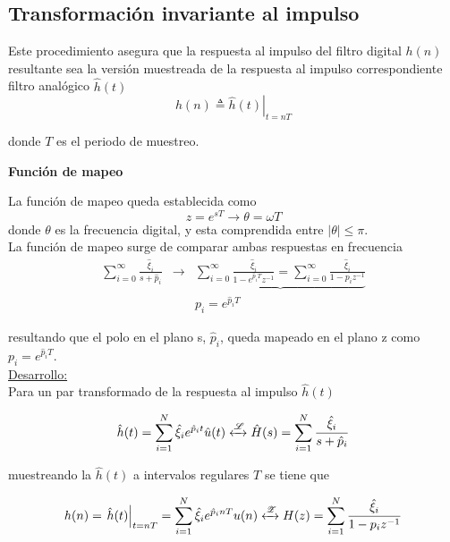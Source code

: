 \documentclass[informe.tex]{subfiles}
\begin{document}
\subsection{Transformación invariante al impulso }
{
Este procedimiento asegura que la respuesta al impulso del filtro digital $h(n)$ resultante sea la versión muestreada de la respuesta al impulso correspondiente filtro analógico $\hat{h}(t)$ 
		$$h(n) \triangleq \left. \hat{h}(t) \right|_{t=nT} $$ 

donde $T$ es el periodo de muestreo.\newline


\textbf{Función de mapeo}\newline

La función de mapeo queda establecida como
$$ 
			z = e^{sT} \rightarrow \theta = \omega T
		$$ 
donde $\theta$ es la frecuencia digital, y esta comprendida entre $|\theta| \leq \pi$.\\

La función de mapeo surge de comparar ambas respuestas en frecuencia
	$$
		\begin{matrix}
			\sum_{i=0}^{\infty} \frac{\hat{ \xi }_i  }
			                      { s + \hat{p}_i } 
			 &  
			 \longrightarrow 
			 &
			\underbrace{
					\sum_{i=0}^{\infty} \frac{ \hat{ \xi }_i }{ 1 - e^{ \hat{p}_i T} z^{-1} }
					=
					\sum_{i=0}^{\infty} \frac{ \hat{ \xi }_i }{ 1 - p_i z^{-1} }
				}
			\\
			& &
	        p_i=e^{\hat{p}_i T}	
		\end{matrix} 
	$$

resultando que el polo en el plano s, $\hat{p}_i$, queda mapeado en el plano z como $p_i=e^{\hat{p}_i T}$.\\
		
		
\underline{Desarrollo:}\\

Para un par transformado de la respuesta al impulso $\hat{h}(t)$

	\begin{equation}
		\label{eqn:iir:invariante:func_1}	
		\hat{h}(t) = \sum_{i=1}^{N} \hat{ \xi }_i e^{ \hat{p}_i t} \hat{u}(t)
		\xleftrightarrow[]{\mathscr{L}}
		\hat{H}(s)=\sum_{i=1}^{N}{ \frac{ \hat{\xi}_i}
									{ s + \hat{p}_i }}
	\end{equation}
	
muestreando la $\hat{h}(t)$ a intervalos regulares $T$ se tiene que

	\begin{equation}
		\label{eqn:iir:invariante:func_2}	
		h(n) =  \left. \hat{h}(t) \right|_{t=nT} 
		           = \sum_{i=1}^{N} \hat{ \xi }_i e^{ \hat{p}_i n T} u(n)
		\xleftrightarrow[]{\mathscr{Z}}
		H(z) = \sum_{i=1}^{N}
		               { \frac{\hat{\xi}_i}
		                      { 1 - p_i z^{-1}}}		           	
	\end{equation}

}
\end{document}
